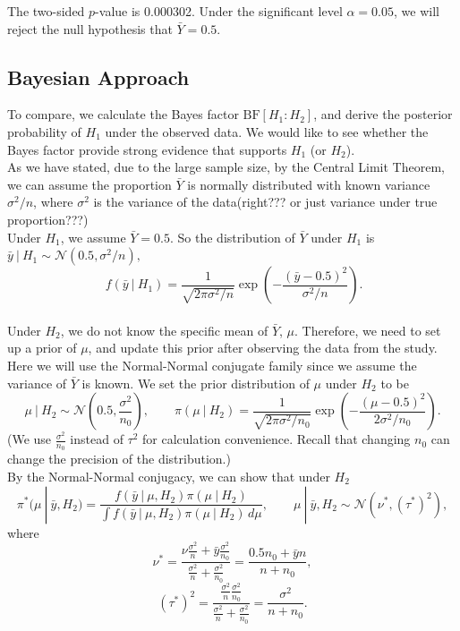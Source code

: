 \documentclass{article}
\def\dsst{\displaystyle}
\begin{document}
The two-sided $p$-value is 0.000302. Under the significant level $\alpha = 0.05$, we will reject the null hypothesis that $\bar{Y} = 0.5$. 

\subsection{Bayesian Approach}

To compare, we calculate the Bayes factor $\text{BF}[H_1:H_2]$, and derive the posterior probability of $H_1$ under the observed data. We would like to see whether the Bayes factor provide strong evidence that supports $H_1$ (or $H_2$). \\

As we have stated, due to the large sample size, by the Central Limit Theorem, we can assume the proportion $\bar{Y}$ is normally distributed with known variance $\sigma^2/n$, where $\sigma^2$ is the variance of the data(right??? or just variance under true proportion???)\\

Under $H_1$, we assume $\bar{Y} = 0.5$. So the distribution of $\bar{Y}$ under $H_1$ is $\bar{y}~|~H_1 \sim \mathcal{N}(0.5, \sigma^2 / n),$ 
$$\ f(\bar{y}~|~H_1) = \dsst \frac{1}{\sqrt{2\pi\sigma^2/n}}\exp\left(-\frac{(\bar{y}-0.5)^2}{\sigma^2/n}\right).$$ \\

Under $H_2$, we do not know the specific mean of $\bar{Y}$, $\mu$. Therefore, we need to set up a prior of $\mu$, and update this prior after observing the data from the study. Here we will use the Normal-Normal conjugate family since we assume the variance of $\bar{Y}$ is known. We set the prior distribution of $\mu$ under $H_2$ to be
$$ \mu~|~H_2 \sim \mathcal{N}(0.5, \frac{\sigma^2}{n_0}), \qquad \pi(\mu~|~H_2) = \frac{1}{\sqrt{2\pi\sigma^2/n_0}}\exp\left(-\frac{(\mu - 0.5)^2}{2\sigma^2/n_0}\right). $$
(We use $\dsst \frac{\sigma^2}{n_0}$ instead of $\tau^2$ for calculation convenience. Recall that changing $n_0$ can change the precision of the distribution.)\\

By the Normal-Normal conjugacy, we can show that under $H_2$
$$ \pi^*(\mu~|~\bar{y}, H_2) = \frac{f(\bar{y}~|~\mu, H_2)\pi(\mu~|~H_2)}{\dsst \int f(\bar{y}~|~\mu, H_2)\pi(\mu~|~H_2)\, d\mu},\qquad \mu~|~\bar{y}, H_2 \sim \mathcal{N}(\nu^*, (\tau^*)^2), $$
where
$$ \nu^* = \frac{\nu \frac{\sigma^2}{n} + \bar{y}\frac{\sigma^2}{n_0}}{\frac{\sigma^2}{n} + \frac{\sigma^2}{n_0}} = \frac{0.5n_0 + \bar{y}n}{n + n_0}, $$
$$ (\tau^*)^2 = \frac{\frac{\sigma^2}{n}\frac{\sigma^2}{n_0}}{\frac{\sigma^2}{n}+\frac{\sigma^2}{n_0}} = \frac{\sigma^2}{n+n_0}. $$
\end{document}
